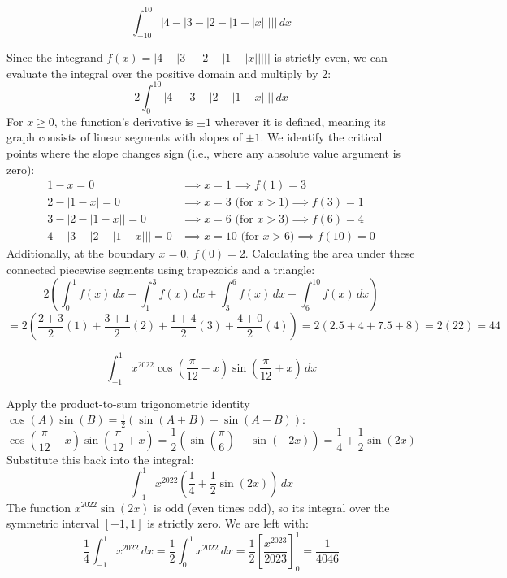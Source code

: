 \begin{questions}
    \question \[ \int_{-10}^{10} |4 - |3 - |2 - |1 - |x||||| \,dx \]
    \begin{solution}
        Since the integrand $f(x) = |4 - |3 - |2 - |1 - |x|||||$ is strictly even, we can evaluate the integral over the positive domain and multiply by 2:
        \[ 2 \int_0^{10} |4 - |3 - |2 - |1 - x|||| \,dx \]
        For $x \ge 0$, the function's derivative is $\pm 1$ wherever it is defined, meaning its graph consists of linear segments with slopes of $\pm 1$. We identify the critical points where the slope changes sign (i.e., where any absolute value argument is zero):
        \begin{align*}
            1 - x = 0 &\implies x = 1 \implies f(1) = 3 \\
            2 - |1 - x| = 0 &\implies x = 3 \text{ (for $x > 1$)} \implies f(3) = 1 \\
            3 - |2 - |1 - x|| = 0 &\implies x = 6 \text{ (for $x > 3$)} \implies f(6) = 4 \\
            4 - |3 - |2 - |1 - x||| = 0 &\implies x = 10 \text{ (for $x > 6$)} \implies f(10) = 0
        \end{align*}
        Additionally, at the boundary $x = 0$, $f(0) = 2$. Calculating the area under these connected piecewise segments using trapezoids and a triangle:
        \[ 2 \left( \int_0^1 f(x) \,dx + \int_1^3 f(x) \,dx + \int_3^6 f(x) \,dx + \int_6^{10} f(x) \,dx \right) \]
        \[ = 2 \left( \frac{2+3}{2}(1) + \frac{3+1}{2}(2) + \frac{1+4}{2}(3) + \frac{4+0}{2}(4) \right) = 2 (2.5 + 4 + 7.5 + 8) = 2(22) = 44 \]
    \end{solution}

    \question \[ \int_{-1}^1 x^{2022} \cos\left(\frac{\pi}{12} - x\right) \sin\left(\frac{\pi}{12} + x\right) \,dx \]
    \begin{solution}
        Apply the product-to-sum trigonometric identity $\cos(A)\sin(B) = \frac{1}{2}(\sin(A+B) - \sin(A-B))$:
        \[ \cos\left(\frac{\pi}{12} - x\right) \sin\left(\frac{\pi}{12} + x\right) = \frac{1}{2}\left( \sin\left(\frac{\pi}{6}\right) - \sin(-2x) \right) = \frac{1}{4} + \frac{1}{2}\sin(2x) \]
        Substitute this back into the integral:
        \[ \int_{-1}^1 x^{2022} \left( \frac{1}{4} + \frac{1}{2}\sin(2x) \right) \,dx \]
        The function $x^{2022}\sin(2x)$ is odd (even times odd), so its integral over the symmetric interval $[-1, 1]$ is strictly zero. We are left with:
        \[ \frac{1}{4} \int_{-1}^1 x^{2022} \,dx = \frac{1}{2} \int_0^1 x^{2022} \,dx = \frac{1}{2} \left[ \frac{x^{2023}}{2023} \right]_0^1 = \frac{1}{4046} \]
    \end{solution}


\end{questions}
